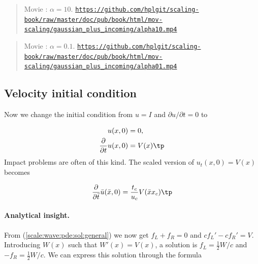 \documentclass[graybox,envcountchap,sectrefs,final]{svmonodo}
\newenvironment{doconce:movie}{}{}
\newcounter{doconce:movie:counter}
\begin{document}
\begin{doconce:movie}
\begin{quote}
Movie : $\alpha=10$. \href{https://github.com/hplgit/scaling-book/raw/master/doc/pub/book/html/mov-scaling/gaussian_plus_incoming/alpha10.mp4}{\nolinkurl{https://github.com/hplgit/scaling-book/raw/master/doc/pub/book/html/mov-scaling/gaussian_plus_incoming/alpha10.mp4}}
\end{quote}
\end{doconce:movie}



\begin{doconce:movie}
\begin{quote}
Movie : $\alpha=0.1$. \href{https://github.com/hplgit/scaling-book/raw/master/doc/pub/book/html/mov-scaling/gaussian_plus_incoming/alpha01.mp4}{\nolinkurl{https://github.com/hplgit/scaling-book/raw/master/doc/pub/book/html/mov-scaling/gaussian_plus_incoming/alpha01.mp4}}
\end{quote}
\end{doconce:movie}



\subsection{Velocity initial condition}
\label{scale:wave:pde2:Vcond}

Now we change the initial condition from $u=I$ and $\partial u/\partial t = 0$ to

\begin{align}
u(x,0) &= 0,\\ 
\frac{\partial}{\partial t} u(x,0) &= V(x)\tp
\end{align}
Impact problems are often of this kind.
The scaled version of $u_t(x,0)=V(x)$ becomes

\[ \frac{\partial}{\partial \bar t} \bar u(\bar x,0) =
\frac{t_c}{u_c}V(\bar x x_c)\tp
\]

\paragraph{Analytical insight.}
From (\ref{scale:wave:pde:sol:general}) we now get $f_L + f_R =0$ and
$cf_L' - cf_R' = V$. Introducing $W(x)$ such that $W'(x)=V(x)$, a solution
is $f_L=\frac{1}{2}W/c$ and $-f_R=\frac{1}{2}W/c$. We can express this
solution through the formula
\end{document}
